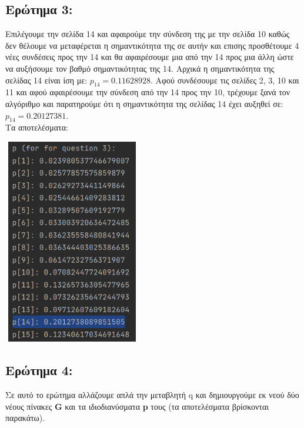 \documentclass{article}
\begin{document}
\subsection{Ερώτημα 3:}
Επιλέγουμε την σελίδα 14 και αφαιρούμε την σύνδεση της με την σελίδα 10 καθώς δεν θέλουμε να μεταφέρεται η σημαντικότητα της σε αυτήν και επισης προσθέτουμε 4 νέες συνδέσεις προς την 14 και θα αφαιρέσουμε μια από την 14 προς μια άλλη ώστε να αυξήσουμε τον βαθμό σημαντικότητας της 14. Αρχικά η σημαντικότητα της σελίδας 14 είναι ίση με: \(p_{14} = 0.11628928\). Αφού συνδέσουμε τις σελίδες 2, 3, 10 και 11 και αφού αφαιρέσουμε την σύνδεση από την 14 προς την 10, τρέχουμε ξανά τον αλγόριθμο και παρατηρούμε ότι η σημαντικότητα της σελίδας 14 έχει αυξηθεί σε: \(p_{14} = 0.20127381\). \\

Τα αποτελέσματα:
\begin{center}\includegraphics[width = 6cm, height = 9cm]{images/results_31.png}\end{center}

\subsection{Ερώτημα 4:}
    Σε αυτό το ερώτημα αλλάζουμε απλά την μεταβλητή q και δημιουργούμε εκ νεού δύο νέους πίνακες \textbf{G} και τα ιδιοδιανύσματα  \textbf{p} τους (τα αποτελέσματα βρίσκονται παρακάτω). \\
    
\end{document}
